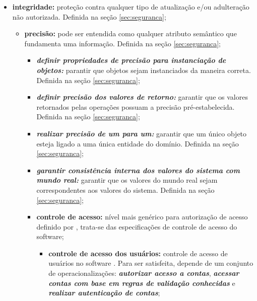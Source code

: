 \begin{itemize}
	
	\item \textbf{integridade:} proteção contra qualquer tipo de atualização e/ou adulteração não autorizada. Definida na seção \ref{sec:seguranca};
	
	\begin{itemize}
		
		\item \textbf{precisão:} pode ser entendida como qualquer atributo semântico que fundamenta uma informação. Definida na seção \ref{sec:seguranca};
		
		\begin{itemize}
			
			\item \textbf{\textit{definir propriedades de precisão para instanciação de objetos:}} parantir que objetos sejam instanciados da maneira correta. Definida na seção \ref{sec:seguranca};
			
			\item \textbf{\textit{definir precisão dos valores de retorno:}} garantir que os valores retornados pelas operações possuam a precisão pré-estabelecida. Definida na seção \ref{sec:seguranca};
			
			\item \textbf{\textit{realizar precisão de um para um:}} garantir que um único objeto esteja ligado a uma única entidade do domínio. Definida na seção \ref{sec:seguranca};
			
			\item \textbf{\textit{garantir consistência interna dos valores do sistema com mundo real:}} garantir que os valores do mundo real sejam correspondentes aos valores do sistema. Definida na seção \ref{sec:seguranca};
			
			\item \textbf{controle de acesso:} nível mais genérico para autorização de acesso definido por \cite{chung2012non}, trata-se das especificações de controle de acesso do software; 
			
			\begin{itemize}
				
				\item \textbf{controle de acesso dos usuários:} controle de acesso de usuários no software \cite{chung2012non}. Para ser satisfeita, depende de um conjunto de operacionalizações: \textbf{\textit{autorizar acesso a contas}}, \textbf{\textit{acessar contas com base em regras de validação conhecidas}} e \textbf{\textit{realizar autenticação de contas}};
				

\end{itemize}
\end{itemize}
\end{itemize}
\end{itemize}
